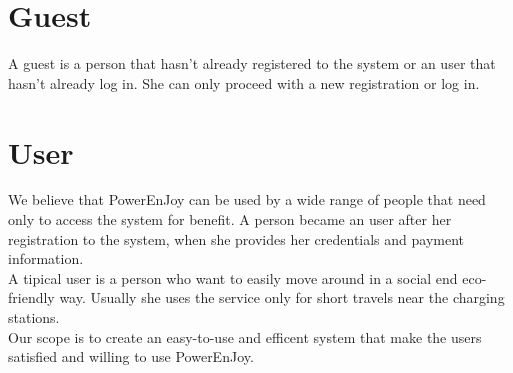 \section{Guest}
A guest is a person that hasn't already registered to the system or an user that hasn't already log in. She can only proceed with a new registration or log in.
\section{User}
We believe that PowerEnJoy can be used by a wide range of people that need only to access the system for benefit. A person became an user after her registration to the system, when she provides her credentials and payment information. 
\\A tipical user is a person who want to easily move around in a social end eco-friendly way. Usually she uses the service only for short travels near the \glspl{charging station}.
\\Our scope is to create an easy-to-use and efficent system that make the users satisfied and willing to use PowerEnJoy.


